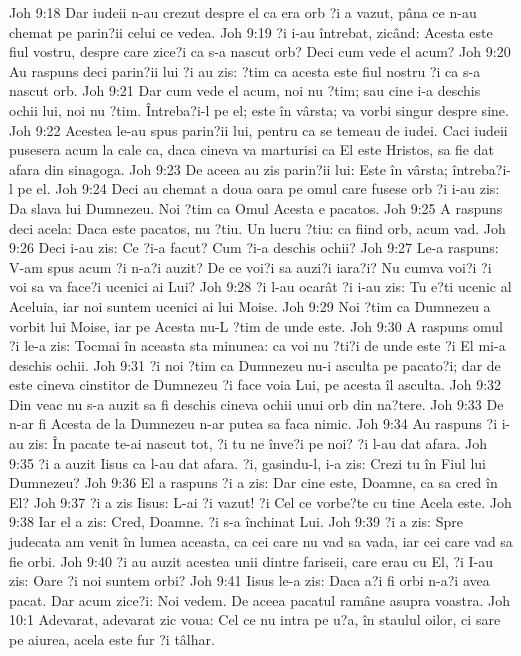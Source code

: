 Joh 9:18  Dar iudeii n-au crezut despre el ca era orb ?i a vazut, pâna ce n-au chemat pe parin?ii celui ce vedea.
Joh 9:19  ?i i-au întrebat, zicând: Acesta este fiul vostru, despre care zice?i ca s-a nascut orb? Deci cum vede el acum?
Joh 9:20  Au raspuns deci parin?ii lui ?i au zis: ?tim ca acesta este fiul nostru ?i ca s-a nascut orb.
Joh 9:21  Dar cum vede el acum, noi nu ?tim; sau cine i-a deschis ochii lui, noi nu ?tim. Întreba?i-l pe el; este în vârsta; va vorbi singur despre sine.
Joh 9:22  Acestea le-au spus parin?ii lui, pentru ca se temeau de iudei. Caci iudeii pusesera acum la cale ca, daca cineva va marturisi ca El este Hristos, sa fie dat afara din sinagoga.
Joh 9:23  De aceea au zis parin?ii lui: Este în vârsta; întreba?i-l pe el.
Joh 9:24  Deci au chemat a doua oara pe omul care fusese orb ?i i-au zis: Da slava lui Dumnezeu. Noi ?tim ca Omul Acesta e pacatos.
Joh 9:25  A raspuns deci acela: Daca este pacatos, nu ?tiu. Un lucru ?tiu: ca fiind orb, acum vad.
Joh 9:26  Deci i-au zis: Ce ?i-a facut? Cum ?i-a deschis ochii?
Joh 9:27  Le-a raspuns: V-am spus acum ?i n-a?i auzit? De ce voi?i sa auzi?i iara?i? Nu cumva voi?i ?i voi sa va face?i ucenici ai Lui?
Joh 9:28  ?i l-au ocarât ?i i-au zis: Tu e?ti ucenic al Aceluia, iar noi suntem ucenici ai lui Moise.
Joh 9:29  Noi ?tim ca Dumnezeu a vorbit lui Moise, iar pe Acesta nu-L ?tim de unde este.
Joh 9:30  A raspuns omul ?i le-a zis: Tocmai în aceasta sta minunea: ca voi nu ?ti?i de unde este ?i El mi-a deschis ochii.
Joh 9:31  ?i noi ?tim ca Dumnezeu nu-i asculta pe pacato?i; dar de este cineva cinstitor de Dumnezeu ?i face voia Lui, pe acesta îl asculta.
Joh 9:32  Din veac nu s-a auzit sa fi deschis cineva ochii unui orb din na?tere.
Joh 9:33  De n-ar fi Acesta de la Dumnezeu n-ar putea sa faca nimic.
Joh 9:34  Au raspuns ?i i-au zis: În pacate te-ai nascut tot, ?i tu ne înve?i pe noi? ?i l-au dat afara.
Joh 9:35  ?i a auzit Iisus ca l-au dat afara. ?i, gasindu-l, i-a zis: Crezi tu în Fiul lui Dumnezeu?
Joh 9:36  El a raspuns ?i a zis: Dar cine este, Doamne, ca sa cred în El?
Joh 9:37  ?i a zis Iisus: L-ai ?i vazut! ?i Cel ce vorbe?te cu tine Acela este.
Joh 9:38  Iar el a zis: Cred, Doamne. ?i s-a închinat Lui.
Joh 9:39  ?i a zis: Spre judecata am venit în lumea aceasta, ca cei care nu vad sa vada, iar cei care vad sa fie orbi.
Joh 9:40  ?i au auzit acestea unii dintre fariseii, care erau cu El, ?i I-au zis: Oare ?i noi suntem orbi?
Joh 9:41  Iisus le-a zis: Daca a?i fi orbi n-a?i avea pacat. Dar acum zice?i: Noi vedem. De aceea pacatul ramâne asupra voastra.
Joh 10:1  Adevarat, adevarat zic voua: Cel ce nu intra pe u?a, în staulul oilor, ci sare pe aiurea, acela este fur ?i tâlhar.
